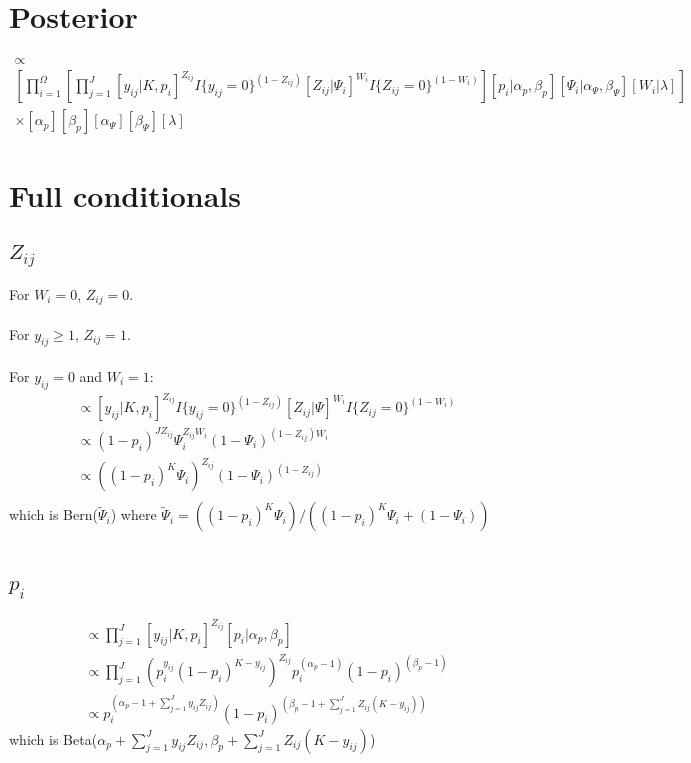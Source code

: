 \documentclass[fleqn]{article}
\def\bm#1{\mbox{\boldmath $#1$}}
\begin{document}
\section{Posterior}
%
\begin{multline}
  [\bm{Z}, \bm{p},  \bm{\Psi}, \bm{W}, \alpha_p, \beta_p, \alpha_\Psi, \beta_\Psi, \lambda | \bm{y}, K]  \propto   \\
     \left[  \prod_{i = 1}^\Omega     \left[ \prod_{j = 1}^J [y_{ij} | K, p_i]^{Z_{ij}} I\{y_{ij} = 0 \}^{(1 -  Z_{ij})} [Z_{ij} | \Psi_i]^{W_i} I\{Z_{ij} = 0 \}^{(1 -  W_i)} \right]  [p_i | \alpha_p, \beta_p] [\Psi_i | \alpha_\Psi, \beta_\Psi] [W_i | \lambda] \right]     \\
     \times   [\alpha_p] [\beta_p] [\alpha_\Psi] [\beta_\Psi] [\lambda]
\end{multline}
%
\section{Full conditionals}
%
\subsection{$Z_{ij}$}
%
For $W_{i} = 0$, $Z_{ij} = 0$.\\
\\
For $y_{ij} \geq 1$, $Z_{ij} = 1$.\\
\\
For $y_{ij} = 0$ and $W_i = 1$:
\begin{align*}
  [Z_{ij} | \cdot] & \propto [y_{ij} | K, p_i]^{Z_{ij}} I \{y_{ij} = 0 \}^{(1 - Z_{ij})} [Z_{ij} | \Psi]^{W_i} I \{Z_{ij} = 0 \}^{(1 - W_{i})}\\
  & \propto (1 - p_i)^{J Z_{ij}} \Psi_i^{Z_{ij} W_i} (1 - \Psi_i)^{(1 - Z_{ij}) W_i}\\
  & \propto \left( (1 - p_i)^K \Psi_i \right)^{Z_{ij}} \left(1 - \Psi_i \right)^{(1 - Z_{ij})}\\
\end{align*}
which is Bern($\tilde{\Psi}_i$) where $\tilde{\Psi}_i = \left( (1 - p_i)^K \Psi_i \right) / \left( (1 - p_i)^K \Psi_i + (1 - \Psi_i)\right)$\\
\\
%
%
\subsection{$p_i$}
%
\begin{align*}
  [p_i | \cdot] & \propto \prod_{j = 1}^J [y_{ij} | K, p_i]^{Z_{ij}} [p_i | \alpha_p, \beta_p]\\
  & \propto \prod_{j = 1}^J \left( p_i^{y_{ij}} (1 - p_i)^{K - y_{ij}} \right)^{Z_{ij}} p_i^{(\alpha_p - 1)} (1 - p_i)^{(\beta_p - 1)}\\
    & \propto p_i^{\left( \alpha_p - 1 + \sum_{j = 1}^J y_{ij} Z_{ij} \right)} (1 - p_i)^{\left( \beta_p - 1 + \sum_{j = 1}^J Z_{ij} (K - y_{ij}) \right)}
\end{align*}
%
which is Beta($\alpha_p + \sum_{j = 1}^J y_{ij} Z_{ij}, \beta_p + \sum_{j = 1}^J Z_{ij} (K - y_{ij})$)
%
%
%
\end{document}
